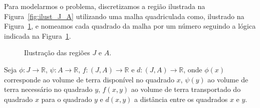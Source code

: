 Para modelarmos o problema, discretizamos a região ilustrada na
Figura~\ref{fig:ilust_J_A} utilizando uma malha quadriculada como, ilustrado na
Figura~\ref{fig:disc_J_A}, e nomeamos cada quadrado da malha por um número
seguindo a lógica indicada na Figura~\ref{fig:disc_J_A}.
\begin{figure}[!htb]
    \centering
    \caption{Ilustra\c{c}\~{a}o das regiões $J$ e $A$.}
    \label{fig:disc_J_A}
\end{figure}

Seja $\phi : J \to \mathbb{R}$, $\psi: A \to \mathbb{R}$, $f: (J, A) \to
\mathbb{R}$ e $d: (J, A) \to \mathbb{R}$, onde $\phi(x)$ corresponde ao volume
de terra disponível no quadrado $x$, $\psi(y)$ ao volume de terra necessário no
quadrado $y$, $f(x,y)$ ao volume de terra transportado do quadrado $x$ para o
quadrado $y$ e $d(x, y)$ a distância entre os quadrados $x$ e $y$.

